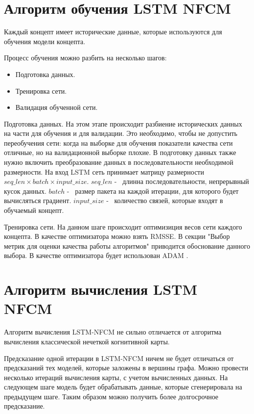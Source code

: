 \section{Алгоритм обучения LSTM NFCM}

Каждый концепт имеет исторические данные, которые используются
для обучения модели концепта.

Процесс обучения можно разбить на несколько шагов:

\begin{itemize}
	\item Подготовка данных.
	\item Тренировка сети.
	\item Валидация обученной сети.
\end{itemize}

Подготовка данных. На этом этапе происходит разбиение
исторических данных на части для обучения и для валидации.
Это необходимо, чтобы не допустить переобучения сети:
когда на выборке для обучения показатели качества сети
отличные, но на валидационной выборке плохие.
В подготовку данных также нужно включить преобразование данных
в последовательности необходимой размерности. На вход
LSTM сеть принимает матрицу размерности $ seq\_len \times batch \times input\_size $.
$ seq\_len $ -~ длинна последовательности, непрерывный кусок данных.
$ batch $ -~ размер пакета на каждой итерации, для которого будет вычисляться градиент.
$ input\_size $ -~ количество связей, которые входят в обучаемый концепт.

Тренировка сети. На данном шаге происходит оптимизиция весов
сети каждого концепта. В качестве оптимизатора
можно взять RMSSE.
В секции "Выбор метрик для оценки качества работы алгоритмов"
приводится обоснование данного выбора.
В качестве оптимизатора будет использован ADAM \cite{adam2014}.

\section{Алгоритм вычисления LSTM NFCM}

Алгоритм вычисления LSTM-NFCM не сильно отличается от
алгоритма вычисления классической нечеткой когнитивной карты.

Предсказание одной итерации в LSTM-NFCM ничем не будет отличаться
от предсказаний тех моделей, которые заложены в вершины графа.
Можно провести несколько итераций вычисления карты, с учетом вычисленных
данных. На следующем шаге модель будет обрабатывать данные,
которые сгенерировала на предыдущем шаге. Таким образом можно получить
более долгосрочное предсказание.

